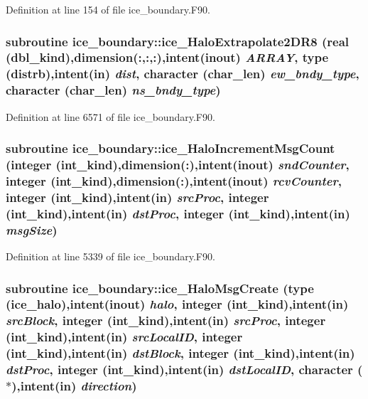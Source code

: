 Definition at line 154 of file ice\_\-boundary.F90.\hypertarget{namespaceice__boundary_a9a42897a89fe284fadbec048591e5742}{
\subsubsection[{ice\_\-HaloExtrapolate2DR8}]{\setlength{\rightskip}{0pt plus 5cm}subroutine ice\_\-boundary::ice\_\-HaloExtrapolate2DR8 (real (dbl\_\-kind),dimension(:,:,:),intent(inout) {\em ARRAY}, \/  type ({\bf distrb}),intent(in) {\em dist}, \/  character (char\_\-len) {\em ew\_\-bndy\_\-type}, \/  character (char\_\-len) {\em ns\_\-bndy\_\-type})}}
\label{namespaceice__boundary_a9a42897a89fe284fadbec048591e5742}


Definition at line 6571 of file ice\_\-boundary.F90.\hypertarget{namespaceice__boundary_af0d91bf9b575aaf512efac718c9b099c}{
\subsubsection[{ice\_\-HaloIncrementMsgCount}]{\setlength{\rightskip}{0pt plus 5cm}subroutine ice\_\-boundary::ice\_\-HaloIncrementMsgCount (integer (int\_\-kind),dimension(:),intent(inout) {\em sndCounter}, \/  integer (int\_\-kind),dimension(:),intent(inout) {\em rcvCounter}, \/  integer (int\_\-kind),intent(in) {\em srcProc}, \/  integer (int\_\-kind),intent(in) {\em dstProc}, \/  integer (int\_\-kind),intent(in) {\em msgSize})}}
\label{namespaceice__boundary_af0d91bf9b575aaf512efac718c9b099c}


Definition at line 5339 of file ice\_\-boundary.F90.\hypertarget{namespaceice__boundary_afcc8942d5d5ac4c20ac64915b98f376c}{
\subsubsection[{ice\_\-HaloMsgCreate}]{\setlength{\rightskip}{0pt plus 5cm}subroutine ice\_\-boundary::ice\_\-HaloMsgCreate (type (ice\_\-halo),intent(inout) {\em halo}, \/  integer (int\_\-kind),intent(in) {\em srcBlock}, \/  integer (int\_\-kind),intent(in) {\em srcProc}, \/  integer (int\_\-kind),intent(in) {\em srcLocalID}, \/  integer (int\_\-kind),intent(in) {\em dstBlock}, \/  integer (int\_\-kind),intent(in) {\em dstProc}, \/  integer (int\_\-kind),intent(in) {\em dstLocalID}, \/  character ($\ast$),intent(in) {\em direction})}}
\label{namespaceice__boundary_afcc8942d5d5ac4c20ac64915b98f376c}


